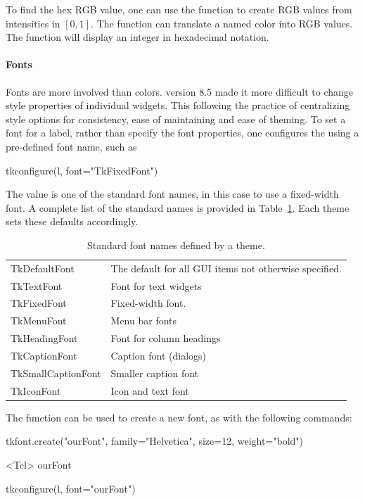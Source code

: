 To find the hex RGB value, one can use the  function to
create RGB values from intensities in $[0,1]$.  The \R\/ function
 can translate a named color into RGB values. The
 function will display an integer in hexadecimal
notation.

\paragraph{Fonts}
Fonts are more involved than colors. \TK\/ version 8.5 made it more
difficult to change style properties of individual widgets. This
following the practice of centralizing style options for consistency,
ease of maintaining and ease of theming.  To set a font for a label,
rather than specify the font properties, one configures the  using a pre-defined font name, such as
\begin{Schunk}
\begin{Sinput}
 tkconfigure(l, font="TkFixedFont")
\end{Sinput}
\end{Schunk}

The  value is one of the standard font names, in
this case to use a fixed-width font. A complete list of the standard
names is provided in Table~\ref{tab:tcltk-std-fonts}. Each theme sets
these defaults accordingly.
\begin{table}
\centering
\label{tab:tcltk-std-fonts}
\caption{Standard font names defined by a theme.}
\begin{tabular}{@{}ll@{}}
\toprule

\\
\midrule
TkDefaultFont&The default for all GUI items not otherwise specified.\\TkTextFont&Font for text widgets\\TkFixedFont&Fixed-width font.\\TkMenuFont&Menu bar fonts\\TkHeadingFont&Font for column headings\\TkCaptionFont&Caption font (dialogs)\\TkSmallCaptionFont&Smaller caption font\\TkIconFont&Icon and text font
\\ \bottomrule
\end{tabular}
\end{table}
The  function can be used to create a new font, as with the following commands:
\begin{Schunk}
\begin{Sinput}
 tkfont.create("ourFont", family="Helvetica", size=12, 
               weight="bold")
\end{Sinput}
\begin{Soutput}
<Tcl> ourFont 
\end{Soutput}
\begin{Sinput}
 tkconfigure(l, font="ourFont")
\end{Sinput}
\end{Schunk}

